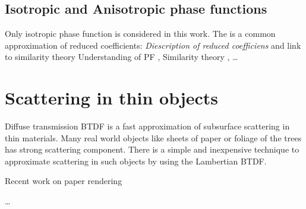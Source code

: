 \subsection{Isotropic and Anisotropic phase functions}
\label{section:phasefunction_approximation}
Only isotropic phase function is considered in this work. The is a common approximation of reduced
coefficients:
\emph{Diescription of reduced coefficiens} and link to similarity theory
Understanding of PF \cite{Gkioulekas:2013:URP:2516971.2516972}, Similarity theory
\cite{Zhao:2014:HSR:2601097.2601104}, \cite{Gkioulekas:2013:IVR:2508363.2508377}
\ldots



\section{Scattering in thin objects}
Diffuse transmission BTDF is a fast approximation of subsurface scattering
in thin materials.
Many real world objects like sheets of paper or foliage of the trees has strong
scattering component. There is a simple and inexpensive technique to approximate
scattering in such objects by using the Lambertian BTDF.

Recent work on paper rendering \cite{DBLP:journals/cgf/PapasMJ14}

\ldots
